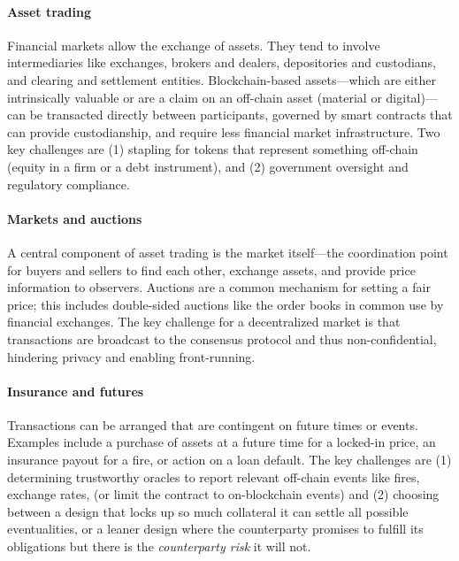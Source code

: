 \paragraph{Asset trading}

Financial markets allow the exchange of assets. They tend to involve intermediaries like exchanges, brokers and dealers, depositories and custodians, and clearing and settlement entities. Blockchain-based assets---which are either intrinsically valuable or are a claim on an off-chain asset (material or digital)---can be transacted directly between participants, governed by smart contracts that can provide custodianship, and require less financial market infrastructure. Two key challenges are (1) stapling for tokens that represent something off-chain (\ie equity in a firm or a debt instrument), and (2) government oversight and regulatory compliance.

\paragraph{Markets and auctions}

A central component of asset trading is the market itself---the coordination point for buyers and sellers to find each other, exchange assets, and provide price information to observers.
Auctions are a common mechanism for setting a fair price; this includes double-sided auctions like the order books in common use by financial exchanges. 
The key challenge for a decentralized market is that transactions are broadcast to the consensus protocol and thus non-confidential, hindering privacy and enabling front-running.

\paragraph{Insurance and futures}

Transactions can be arranged that are contingent on future times or events. Examples include a purchase of assets at a future time for a locked-in price, an insurance payout for a fire, or action on a loan default. The key challenges are (1) determining trustworthy oracles to report relevant off-chain events like fires, exchange rates, \etc (or limit the contract to on-blockchain events) and (2) choosing between a design that locks up so much collateral it can settle all possible eventualities, or a leaner design where the counterparty promises to fulfill its obligations but there is the \textit{counterparty risk} it will not.

